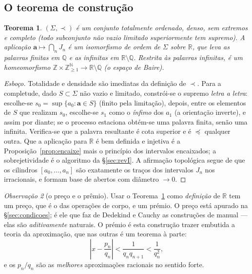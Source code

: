 \documentclass[11pt,a4paper]{article}
\theoremstyle{plain}
\newtheorem{teorema}{Teorema}[section]
\theoremstyle{definition}
\theoremstyle{remark}
\newtheorem{obs}[teorema]{Observação}
\newcommand{\R}{\mathbb{R}}
\newcommand{\Q}{\mathbb{Q}}
\newcommand{\Z}{\mathbb{Z}}
\newcommand{\N}{\mathbb{N}}
\newcommand{\Sig}{\Sigma}
\begin{document}
\subsection{O teorema de construção}

\begin{teorema}\label{thm:constr}
$(\Sig,\prec)$ é um conjunto totalmente ordenado, denso, sem extremos e \emph{completo}
(todo subconjunto não vazio limitado superiormente tem supremo). A aplicação
$\mathbf a \mapsto \bigcap_n J_n$ é um isomorfismo de ordem de $\Sig$ sobre $\R$, que leva as
palavras finitas em $\Q$ e as infinitas em $\R\setminus\Q$. Restrita às palavras infinitas, é
um homeomorfismo $\Z\times\Z_{\geq1}^{\N} \to \R\setminus\Q$ (o espaço de Baire).
\end{teorema}

\begin{proof}[Esboço]
Totalidade e densidade são imediatas da definição de $\prec$. Para a completude, dado
$S\subset\Sig$ não vazio e limitado, constrói-se o supremo \emph{letra a letra}: escolhe-se
$s_0 = \sup\{a_0 : \mathbf a \in S\}$ (finito pela limitação), depois, entre os elementos de $S$
que realizam $s_0$, escolhe-se $s_1$ como o \emph{ínfimo} dos $a_1$ (a orientação inverte),
e assim por diante; se o processo estaciona obtém-se uma palavra finita, senão uma infinita.
Verifica-se que a palavra resultante é cota superior e é $\preceq$ qualquer outra.
Que a aplicação para $\R$ é bem definida e injetiva é a Proposição~\ref{prop:encaixe} mais o
princípio dos intervalos encaixados; a sobrejetividade é o algoritmo da \S\ref{sec:revI}.
A afirmação topológica segue de que os cilindros $[a_0,\dots,a_n]$ são exatamente os traços dos
intervalos $J_n$ nos irracionais, e formam base de abertos com diâmetro $\to 0$.
\end{proof}

\begin{obs}[o preço e o prêmio]
Usar o Teorema~\ref{thm:constr} como \emph{definição} de $\R$ tem um preço, que é o das operações
de corpo, e um prémio. O preço está apurado na \S\ref{sec:condicoes}; é ele que faz de Dedekind e
Cauchy as construções de manual --- elas são \emph{aditivamente} naturais. O prémio é esta
construção trazer embutida a teoria da aproximação, que nas outras é um teorema à parte:
\[
  \left| x - \frac{p_n}{q_n}\right| < \frac{1}{q_nq_{n+1}} < \frac{1}{q_n^2},
\]
e os $p_n/q_n$ são as \emph{melhores} aproximações racionais no sentido forte.
\end{obs}
\end{document}
